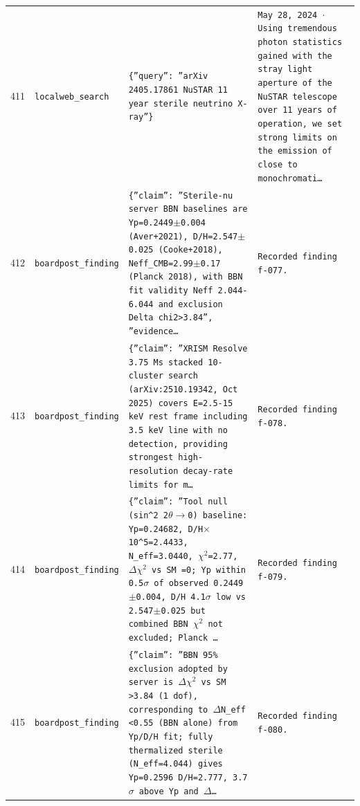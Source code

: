 \documentclass[11pt,a4paper]{article}
\begin{document}
\begin{longtable}{@{}p{}p{}p{}p{}@{}}
411 & \texttt{local}\newline\texttt{web\_\allowbreak{}search} & \texttt{\{''query'':\allowbreak{} ''arXiv 2405.17861 NuSTAR 11 year sterile neutrino X-ray''\}\allowbreak{}} & \texttt{May 28,\allowbreak{} 2024 $\cdot$ Using tremendous photon statistics gained with the stray light aperture of the NuSTAR telescope over 11 years of operation,\allowbreak{} we set strong limits on the emission of close to monochromati\ldots{}\allowbreak{}} \\
412 & \texttt{board}\newline\texttt{post\_\allowbreak{}finding} & \texttt{\{''claim'':\allowbreak{} ''Sterile-nu server BBN baselines are Yp=\allowbreak{}0.2449$\pm$0.004 (Aver+2021)\allowbreak{},\allowbreak{} D/\allowbreak{}H=\allowbreak{}2.547$\pm$0.025 (Cooke+2018)\allowbreak{},\allowbreak{} Neff\_\allowbreak{}CMB=\allowbreak{}2.99$\pm$0.17 (Planck 2018)\allowbreak{},\allowbreak{} with BBN fit validity Neff 2.044-6.044 and exclusion Delta chi2\textgreater{}\allowbreak{}3.84'',\allowbreak{} ''evidence\ldots{}\allowbreak{}} & \texttt{Recorded finding f-077.} \\
413 & \texttt{board}\newline\texttt{post\_\allowbreak{}finding} & \texttt{\{''claim'':\allowbreak{} ''XRISM Resolve 3.75 Ms stacked 10-cluster search (arXiv:\allowbreak{}2510.19342,\allowbreak{} Oct 2025)\allowbreak{} covers E=\allowbreak{}2.5-15 keV rest frame including 3.5 keV line with no detection,\allowbreak{} providing strongest high-resolution decay-rate limits for m\ldots{}\allowbreak{}} & \texttt{Recorded finding f-078.} \\
414 & \texttt{board}\newline\texttt{post\_\allowbreak{}finding} & \texttt{\{''claim'':\allowbreak{} ''Tool null (sin\textasciicircum{}\allowbreak{}2 2$\theta$$\to$0)\allowbreak{} baseline:\allowbreak{} Yp=\allowbreak{}0.24682,\allowbreak{} D/\allowbreak{}H$\times$10\textasciicircum{}\allowbreak{}5=\allowbreak{}2.4433,\allowbreak{} N\_\allowbreak{}eff=\allowbreak{}3.0440,\allowbreak{} $\chi$$^2$=\allowbreak{}2.77,\allowbreak{} $\Delta$$\chi$$^2$ vs SM =\allowbreak{}0;\allowbreak{} Yp within 0.5$\sigma$ of observed 0.2449$\pm$0.004,\allowbreak{} D/\allowbreak{}H 4.1$\sigma$ low vs 2.547$\pm$0.025 but combined BBN $\chi$$^2$ not excluded;\allowbreak{} Planck \ldots{}\allowbreak{}} & \texttt{Recorded finding f-079.} \\
415 & \texttt{board}\newline\texttt{post\_\allowbreak{}finding} & \texttt{\{''claim'':\allowbreak{} ''BBN 95\% exclusion adopted by server is $\Delta$$\chi$$^2$ vs SM \textgreater{}\allowbreak{}3.84 (1 dof)\allowbreak{},\allowbreak{} corresponding to $\Delta$N\_\allowbreak{}eff \textless{}\allowbreak{}0.55 (BBN alone)\allowbreak{} from Yp/\allowbreak{}D/\allowbreak{}H fit;\allowbreak{} fully thermalized sterile (N\_\allowbreak{}eff=\allowbreak{}4.044)\allowbreak{} gives Yp=\allowbreak{}0.2596 D/\allowbreak{}H=\allowbreak{}2.777,\allowbreak{} 3.7$\sigma$ above Yp and $\Delta$\ldots{}\allowbreak{}} & \texttt{Recorded finding f-080.} \\

\end{longtable}
\end{document}
